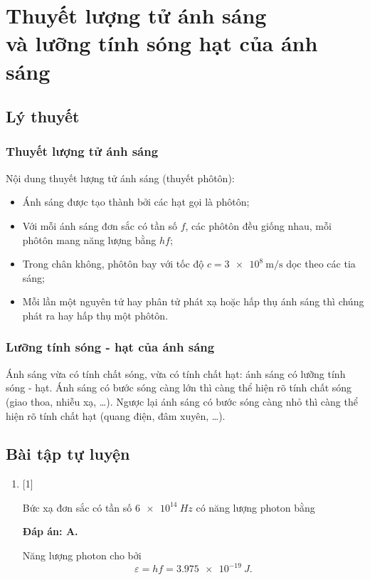 
\chapter[Thuyết lượng tử ánh sáng và lưỡng tính sóng hạt của ánh sáng]{ Thuyết lượng tử ánh sáng \\và lưỡng tính sóng hạt của ánh sáng}
\section{Lý thuyết}
\subsection{Thuyết lượng tử ánh sáng}
Nội dung thuyết lượng tử ánh sáng (thuyết phôtôn):
\begin{itemize}
	\item Ánh sáng được tạo thành bởi các hạt gọi là phôtôn;
	\item Với mỗi ánh sáng đơn sắc có tần số $f$, các phôtôn đều giống nhau, mỗi phôtôn mang năng lượng bằng $hf$;
	\item Trong chân không, phôtôn bay với tốc độ $c=\SI{3e8}{\meter / \second}$ dọc theo các tia sáng;
	\item Mỗi lần một nguyên tử hay phân tử phát xạ hoặc hấp thụ ánh sáng thì chúng phát ra hay hấp thụ một phôtôn.
\end{itemize}
\subsection{Lưỡng tính sóng - hạt của ánh sáng}
Ánh sáng vừa có tính chất sóng, vừa có tính chất hạt: ánh sáng có lưỡng tính sóng - hạt. Ánh sáng có bước sóng càng lớn thì càng thể hiện rõ tính chất sóng (giao thoa, nhiễu xạ, \ldots). Ngược lại ánh sáng có bước sóng càng nhỏ thì càng thể hiện rõ tính chất hạt (quang điện, đâm xuyên, \ldots).
\section{Bài tập tự luyện}
\begin{enumerate}[label=\bfseries Câu \arabic*:]
	
	\item {} [1]
	\cauhoi
	{Bức xạ đơn sắc có tần số $\SI{6e14}{Hz}$ có năng lượng photon bằng 
	}
	
	\loigiai
	{		\textbf{Đáp án: A.}
		
		Năng lượng photon cho bởi
		$$
		\varepsilon = hf = \SI{3,975e-19}{J}.
		$$
	}
	
	
\end{enumerate}

